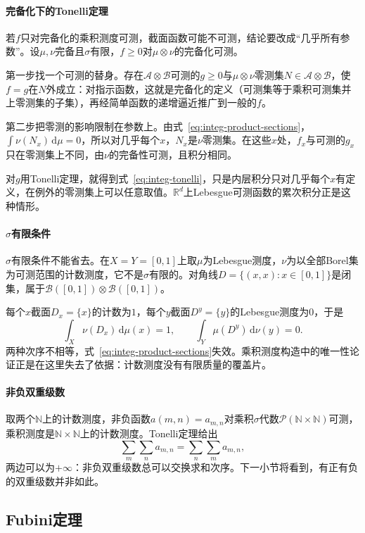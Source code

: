 \paragraph{完备化下的Tonelli定理}
若$f$只对完备化的乘积测度可测，截面函数可能不可测，结论要改成“几乎所有参数”。设$\mu,\nu$完备且$\sigma$有限，$f\geq0$对$\mu\otimes\nu$的完备化可测。

第一步找一个可测的替身。存在$\mathcal A\otimes\mathcal B$可测的$g\geq0$与$\mu\otimes\nu$零测集$N\in\mathcal A\otimes\mathcal B$，使$f=g$在$N$外成立：对指示函数，这就是完备化的定义（可测集等于乘积可测集并上零测集的子集），再经简单函数的递增逼近推广到一般的$f$。

第二步把零测的影响限制在参数上。由式~\eqref{eq:integ-product-sections}，$\int\nu(N_x)\,\mathrm d\mu=0$，所以对几乎每个$x$，$N_x$是$\nu$零测集。在这些$x$处，$f_x$与可测的$g_x$只在零测集上不同，由$\nu$的完备性可测，且积分相同。

对$g$用Tonelli定理，就得到式~\eqref{eq:integ-tonelli}，只是内层积分只对几乎每个$x$有定义，在例外的零测集上可以任意取值。$\mathbb R^d$上Lebesgue可测函数的累次积分正是这种情形。

\paragraph{$\sigma$有限条件}
$\sigma$有限条件不能省去。在$X=Y=[0,1]$上取$\mu$为Lebesgue测度，$\nu$为以全部Borel集为可测范围的计数测度，它不是$\sigma$有限的。对角线$D=\{(x,x):x\in[0,1]\}$是闭集，属于$\mathcal B([0,1])\otimes\mathcal B([0,1])$。

每个$x$截面$D_x=\{x\}$的计数为$1$，每个$y$截面$D^y=\{y\}$的Lebesgue测度为$0$，于是
\[
 \int_X\nu(D_x)\,\mathrm d\mu(x)=1,\qquad \int_Y\mu(D^y)\,\mathrm d\nu(y)=0 .
\]
两种次序不相等，式~\eqref{eq:integ-product-sections}失效。乘积测度构造中的唯一性论证正是在这里失去了依据：计数测度没有有限质量的覆盖片。

\paragraph{非负双重级数}
取两个$\mathbb N$上的计数测度，非负函数$a(m,n)=a_{m,n}$对乘积$\sigma$代数$\mathcal P(\mathbb N\times\mathbb N)$可测，乘积测度是$\mathbb N\times\mathbb N$上的计数测度。Tonelli定理给出
\[
 \sum_m\sum_na_{m,n}=\sum_n\sum_ma_{m,n},
\]
两边可以为$+\infty$：非负双重级数总可以交换求和次序。下一小节将看到，有正有负的双重级数并非如此。

\subsection{Fubini定理}
\label{sec:integ-fubini}

